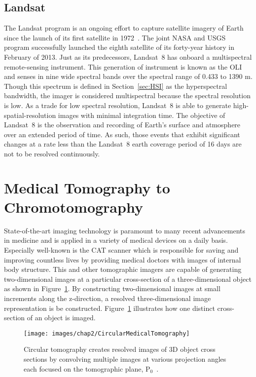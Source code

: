 \subsection{Landsat}
The Landsat program is an ongoing effort to capture satellite imagery of Earth since the launch of its first satellite in 1972~\cite{Landsat}. The joint \ac{NASA} and \ac{USGS} program successfully launched the eighth satellite of its forty-year history in February of 2013. Just as its predecessors, Landsat~8 has onboard a multispectral remote-sensing instrument. This generation of instrument is known as the \ac{OLI} and senses in nine wide spectral bands over the spectral range of 0.433 to 1390 \textmu m. Though this spectrum is defined in Section~\ref{sec:HSI} as the hyperspectral bandwidth, the imager is considered multispectral because the spectral resolution is low. As a trade for low spectral resolution, Landsat~8 is able to generate high-spatial-resolution images with minimal integration time. The objective of Landsat~8 is the observation and recording of Earth's surface and atmosphere over an extended period of time. As such, those events that exhibit significant changes at a rate less than the Landsat~8 earth coverage period of 16 days are not to be resolved continuously.

\section{Medical Tomography to Chromotomography}
\label{sec:medicalTomtoChrom}
State-of-the-art imaging technology is paramount to many recent advancements in medicine and is applied in a variety of medical devices on a daily basis. Especially well-known is the \ac{CAT} scanner which is responsible for saving and improving countless lives by providing medical doctors with images of internal body structure. This and other tomographic imagers are capable of generating two-dimensional images at a particular cross-section of a three-dimensional object as shown in Figure~\ref{fig:CircularTomography}. By constructing two-dimensional images at small increments along the z-direction, a resolved three-dimensional image representation is be constructed. Figure~\ref{fig:CircularTomography} illustrates how one distinct cross-section of an object is imaged.

\begin{figure}[htb]		%
\centering
\texttt{[image: images/chap2/CircularMedicalTomography]}
\caption{Circular tomography creates resolved images of 3D object cross sections by convolving multiple images at various projection angles each focused on the tomographic plane, $\mathrm{P_0}$~\cite{Bostick}.}
\label{fig:CircularTomography}
\end{figure}


